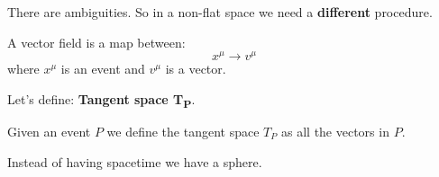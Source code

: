 There are ambiguities. So in a non-flat space we need a \textbf{different} procedure. \par
A vector field is a map between:
\[
x^{\mu } \to v^{\mu }
\]
where $x^{\mu }$ is an event and $v^{\mu }$ is a vector. \par

Let's define: \textbf{Tangent space T\textsubscript{P}}.\par
Given an event $P$ we define the tangent space $T_{P}$ as all the vectors in $P$.\par

Instead of having spacetime we have a sphere.

\noindent
\begin{minipage}[t]{0.48\textwidth}
    \vspace*{0pt}
    


\begin{tikzpicture}[x=0.5pt,y=0.5pt,yscale=-1,xscale=1]


\end{tikzpicture}
\end{minipage}
